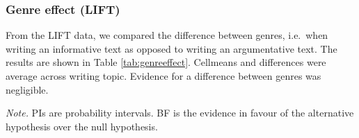 \begin{appendix}
\begin{center}
\begin{ThreePartTable}
\end{ThreePartTable}
\end{center}

\hypertarget{genre-effect-lift}{%
\subsubsection{Genre effect (LIFT)}\label{genre-effect-lift}}

From the LIFT data, we compared the difference between genres, i.e.~when
writing an informative text as opposed to writing an argumentative text.
The results are shown in Table \ref{tab:genreeffect}. Cellmeans and
differences were average across writing topic. Evidence for a difference
between genres was negligible.

\begin{center}
\begin{ThreePartTable}

\begin{TableNotes}[para]
\normalsize{\textit{Note.} PIs are probability intervals. BF is the evidence in favour of the alternative hypothesis over the null hypothesis.}
\end{TableNotes}

\footnotesize{

}
\end{ThreePartTable}
\end{center}
\end{appendix}
